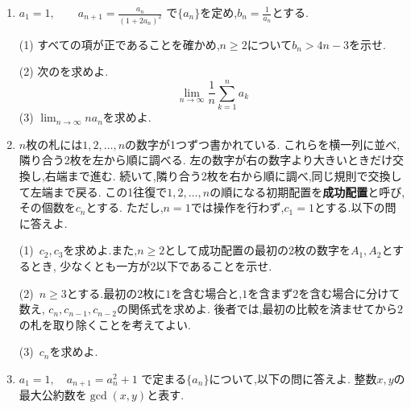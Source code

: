 \begin{enumerate}[label=\textbf{問\arabic*.},leftmargin=3.8em,format=\bookitemlink{practice-entrance}{problem}{hint}]
    (2) $n\geq3$について$\,I_n$と$I_{n-2}$の関係式を求め,$I_3$を計算せよ.
    \par\noindent
    (3) 座標空間において,原点を頂点とし,平面$z=2$上の半径$2$の円を底面とする円錐を考える.
    その内部と表面は,
    \[
      0\leq z\leq2,\qquad x^2+y^2\leq z^2
    \]
    で表される.この円錐のうち$x\geq1$を満たす部分の体積を求めよ.
    \par{}
  \item $a_1=1,\qquad
      a_{n+1}=\frac{a_n}{(1+2a_n)^2}$
    で$\{a_n\}$を定め,$b_n=\frac{1}{a_n}$とする.
    \par\noindent
    (1) すべての項が正であることを確かめ,$n\geq2$について$b_n>4n-3$を示せ.
    \par\noindent
    (2) 次のを求めよ.
    \[
      \lim_{n\to\infty}\frac1n\sum_{k=1}^n a_k
    \]
    (3) $\lim_{n\to\infty}na_n$を求めよ.
    \par{}
  \item $n$枚の札には$1,2,\ldots,n$の数字が1つずつ書かれている.
    これらを横一列に並べ,隣り合う2枚を左から順に調べる.
    左の数字が右の数字より大きいときだけ交換し,右端まで進む.
    続いて,隣り合う2枚を右から順に調べ,同じ規則で交換して左端まで戻る.
    この1往復で$1,2,\ldots,n$の順になる初期配置を\textbf{成功配置}と呼び,その個数を$c_n$とする.
    ただし,$n=1$では操作を行わず,$c_1=1$とする.以下の問に答えよ.

    \smallskip
    \noindent (1)~$c_2,c_3$を求めよ.また,$n\ge2$として成功配置の最初の2枚の数字を$A_1,A_2$とするとき,
    少なくとも一方が$2$以下であることを示せ.

    \smallskip
    \noindent (2)~$n\ge3$とする.最初の2枚に$1$を含む場合と,$1$を含まず$2$を含む場合に分けて数え,
    $c_n,c_{n-1},c_{n-2}$の関係式を求めよ.
    後者では,最初の比較を済ませてから$2$の札を取り除くことを考えてよい.

    \smallskip
    \noindent (3)~$c_n$を求めよ.
    \par{}
  \item $a_1=1,\quad a_{n+1}=a_n^2+1$
    で定まる$\{a_n\}$について,以下の問に答えよ.
    整数$x,y$の最大公約数を$\gcd(x,y)$と表す.


\end{enumerate}

